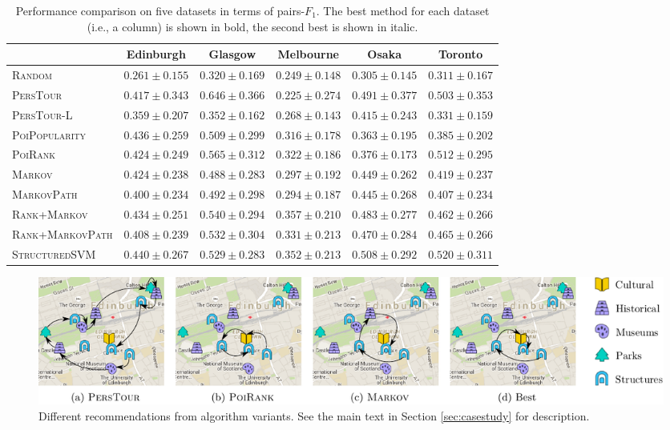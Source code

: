 \begin{table}[t]
\caption{Performance comparison on five datasets in terms of pairs-$F_1$.
         The best method for each dataset (i.e., a column) is shown in bold, the second best is shown in italic.}
\label{tab:pairf1}
\centering
\begin{tabular}{l|ccccc} \hline
 & Edinburgh & Glasgow & Melbourne & Osaka & Toronto \\ \hline
\textsc{Random} & $0.261\pm0.155$ & $0.320\pm0.169$ & $0.249\pm0.148$ & $0.305\pm0.145$ & $0.311\pm0.167$ \\
\textsc{PersTour}\cite{ijcai15} & $0.417\pm0.343$ & $\mathbf{0.646\pm0.366}$ & $0.225\pm0.274$ & $\mathit{0.491\pm0.377}$ & $0.503\pm0.353$ \\
\textsc{PersTour-L} & $0.359\pm0.207$ & $0.352\pm0.162$ & $0.268\pm0.143$ & $0.415\pm0.243$ & $0.331\pm0.159$ \\
\textsc{PoiPopularity} & $\mathit{0.436\pm0.259}$ & $0.509\pm0.299$ & $0.316\pm0.178$ & $0.363\pm0.195$ & $0.385\pm0.202$ \\
\textsc{PoiRank} & $0.424\pm0.249$ & $\mathit{0.565\pm0.312}$ & $0.322\pm0.186$ & $0.376\pm0.173$ & $\mathit{0.512\pm0.295}$ \\
\textsc{Markov} & $0.424\pm0.238$ & $0.488\pm0.283$ & $0.297\pm0.192$ & $0.449\pm0.262$ & $0.419\pm0.237$ \\
\textsc{MarkovPath} & $0.400\pm0.234$ & $0.492\pm0.298$ & $0.294\pm0.187$ & $0.445\pm0.268$ & $0.407\pm0.234$ \\
\textsc{Rank+Markov} & $0.434\pm0.251$ & $0.540\pm0.294$ & $\mathbf{0.357\pm0.210}$ & $0.483\pm0.277$ & $0.462\pm0.266$ \\
\textsc{Rank+MarkovPath} & $0.408\pm0.239$ & $0.532\pm0.304$ & $0.331\pm0.213$ & $0.470\pm0.284$ & $0.465\pm0.266$ \\
\textsc{StructuredSVM} & $\mathbf{0.440\pm0.267}$ & $0.529\pm0.283$ & $\mathit{0.352\pm0.213}$ & $\mathbf{0.508\pm0.292}$ & $\mathbf{0.520\pm0.311}$ \\
\hline
\end{tabular}
\end{table}


\begin{figure}[t]
	\centering
	\includegraphics[width=\textwidth]{fig/example-tour.pdf}
	\caption{Different recommendations from algorithm variants. 
    See the main text in Section \ref{sec:casestudy} for description.}
	\label{fig:exampleresult}
\end{figure}


